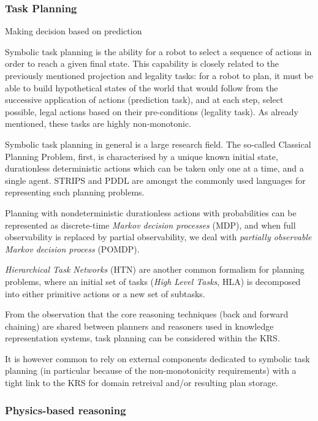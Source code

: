 \documentclass[a4paper, twocolumn]{article}
\begin{document}
\subsubsection{Task Planning}
\label{sect|planning}

Making decision based on prediction

Symbolic task planning is the ability for a robot to select a sequence of
actions in order to reach a given final state. This capability is closely
related to the previously mentioned projection and legality tasks: for a robot
to plan, it must be able to build hypothetical states of the world that would
follow from the successive application of actions (prediction task), and at
each step, select possible, legal actions based on their pre-conditions
(legality task). As already mentioned, these tasks are highly non-monotonic.


Symbolic task planning in general is a large research
field\cite{Russell2009planning}. The so-called Classical Planning Problem,
first, is characterised by a unique known initial state, durationless
deterministic actions which can be taken only one at a time, and a single
agent. STRIPS and PDDL are amongst the commonly used languages for representing
such planning problems.

Planning with nondeterministic durationless actions with probabilities can be
represented as discrete-time \emph{Markov decision processes} (MDP), and when
full observability is replaced by partial observability, we deal with
\emph{partially observable Markov decision process} (POMDP).

\emph{Hierarchical Task Networks} (HTN) are another common formalism for
planning problems, where an initial set of tasks (\emph{High Level Tasks}, HLA)
is decomposed into either primitive actions or a new set of subtasks.

From the observation that the core reasoning techniques (back and forward
chaining) are shared between planners and reasoners used in knowledge
representation systems, task planning can be considered within the KRS.

It is however common to rely on external components dedicated to symbolic task
planning (in particular because of the non-monotonicity requirements) with a
tight link to the KRS for domain retreival and/or resulting plan storage.


\subsubsection{Physics-based reasoning}
\label{sect|physics}
\end{document}
